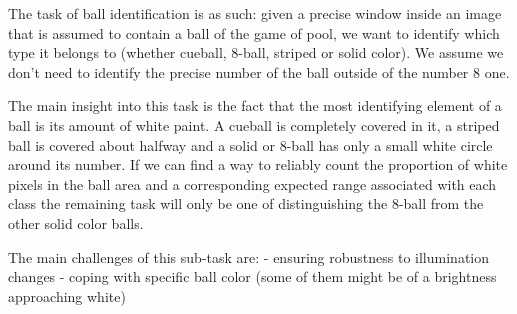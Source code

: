 The task of ball identification is as such: 
given a precise window inside an image that is assumed to 
contain a ball of the game of pool, we want to identify 
which type it belongs to (whether cueball, 8-ball, striped or 
solid color). We assume we don't need to identify the precise 
number of the ball outside of the number 8 one.

The main insight into this task is the fact that the most 
identifying element of a ball is its amount of white paint. 
A cueball is completely covered in it, a striped ball is 
covered about halfway and a solid or 8-ball has only a small 
white circle around its number. If we can find a way to 
reliably count the proportion of white pixels in the ball area 
and a corresponding expected range associated with each class 
the remaining task will only be one of distinguishing the 
8-ball from the other solid color balls.

The main challenges of this sub-task are:
- ensuring robustness to 
  illumination changes
- coping with specific ball color (some of them might 
  be of a brightness approaching white)